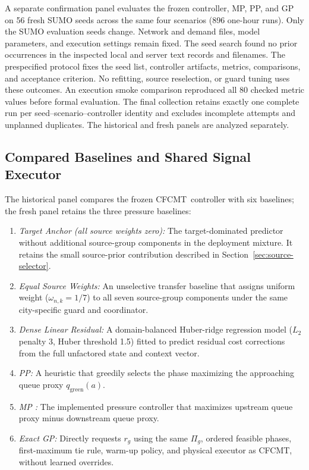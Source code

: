 \documentclass[letterpaper,journal]{IEEEtran}
\newcommand{\method}{CFCMT}
\begin{document}
A separate confirmation panel evaluates the frozen controller, MP, PP, and GP on 56 fresh SUMO seeds across the same four scenarios (896 one-hour runs). Only the SUMO evaluation seeds change. Network and demand files, model parameters, and execution settings remain fixed. The seed search found no prior occurrences in the inspected local and server text records and filenames. The prespecified protocol fixes the seed list, controller artifacts, metrics, comparisons, and acceptance criterion. No refitting, source reselection, or guard tuning uses these outcomes. An execution smoke comparison reproduced all 80 checked metric values before formal evaluation. The final collection retains exactly one complete run per seed--scenario--controller identity and excludes incomplete attempts and unplanned duplicates. The historical and fresh panels are analyzed separately.

\subsection{Compared Baselines and Shared Signal Executor}
The historical panel compares the frozen \method\ controller with six baselines; the fresh panel retains the three pressure baselines:
\begin{enumerate}
    \item \textit{Target Anchor (all source weights zero):} The target-dominated predictor without additional source-group components in the deployment mixture. It retains the small source-prior contribution described in Section~\ref{sec:source-selector}.
    \item \textit{Equal Source Weights:} An unselective transfer baseline that assigns uniform weight ($\omega_{n,k}=1/7$) to all seven source-group components under the same city-specific guard and coordinator.
    \item \textit{Dense Linear Residual:} A domain-balanced Huber-ridge regression model ($L_2$ penalty 3, Huber threshold 1.5) fitted to predict residual cost corrections from the full unfactored state and context vector.
    \item \textit{PP:} A heuristic that greedily selects the phase maximizing the approaching queue proxy $q_{\mathrm{green}}(a)$.
    \item \textit{MP \cite{varaiya2013maxpressure}:} The implemented pressure controller that maximizes upstream queue proxy minus downstream queue proxy.
    \item \textit{Exact GP:} Directly requests $r_g$ using the same $\Pi_g$, ordered feasible phases, first-maximum tie rule, warm-up policy, and physical executor as \method, without learned overrides.
\end{enumerate}
\end{document}
